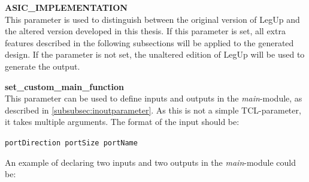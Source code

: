 \begin{description}
\item{\textbf{ASIC\_IMPLEMENTATION}} \hfill \\
This parameter is used to distinguish between the original version of LegUp and the altered version developed in this thesis. If this parameter is set, all extra features described in the following subsections will be applied to the generated design. If the parameter is not set, the unaltered edition of LegUp will be used to generate the output.
\item{\textbf{set\_custom\_main\_function}} \hfill \\
This parameter can be used to define inputs and outputs in the \textit{main}-module, as described in \cref{subsubsec:inoutparameter}. As this is not a simple TCL-parameter, it takes multiple arguments. The format of the input should be: 

\verb!portDirection portSize portName!

An example of declaring two inputs and two outputs in the \textit{main}-module could be:


\end{description}
